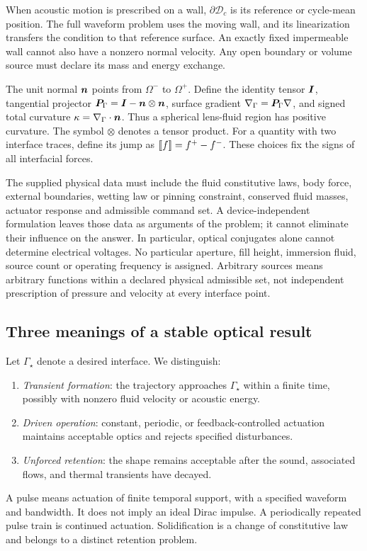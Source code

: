 When acoustic motion is prescribed on a wall, $\partial\mathcal D_c$ is its
reference or cycle-mean position. The full waveform problem uses the moving
wall, and its linearization transfers the condition to that reference surface.
An exactly fixed impermeable wall cannot also have a nonzero normal velocity.
Any open boundary or volume source must declare its mass and energy exchange.

The unit normal $\bm n$ points from $\Omega^-$ to $\Omega^+$. Define the identity
tensor $\bm I$, tangential projector $\bm P_\Gamma=\bm I-\bm n\otimes\bm n$, surface gradient
$\nabla_\Gamma=\bm P_\Gamma\nabla$, and signed total curvature
$\kappa=\nabla_\Gamma\cdot\bm n$. Thus a spherical lens-fluid region has positive
curvature. The symbol $\otimes$ denotes a tensor product. For a quantity with
two interface traces, define its jump as
$\left[\!\left[f\right]\!\right]=f^+-f^-$. These choices fix the signs of all interfacial forces.

The supplied physical data must include the fluid constitutive laws,
body force, external boundaries, wetting law or pinning
constraint, conserved fluid masses, actuator response and admissible command
set. A device-independent formulation leaves those data as arguments of the
problem; it cannot eliminate their influence on the answer. In particular,
optical conjugates alone cannot determine electrical voltages. No particular
aperture, fill height, immersion fluid, source count or operating frequency is
assigned. Arbitrary sources means arbitrary functions within a declared
physical admissible set, not independent prescription of pressure and velocity
at every interface point.

\subsection{Three meanings of a stable optical result}
Let $\Gamma_\star$ denote a desired interface. We distinguish:
\begin{enumerate}
\item \emph{Transient formation}: the trajectory approaches $\Gamma_\star$
within a finite time, possibly with nonzero fluid velocity or acoustic energy.
\item \emph{Driven operation}: constant, periodic, or feedback-controlled
actuation maintains acceptable optics and rejects specified disturbances.
\item \emph{Unforced retention}: the shape remains acceptable after the sound,
associated flows, and thermal transients have decayed.
\end{enumerate}
A pulse means actuation of finite temporal support, with a specified waveform
and bandwidth. It does not imply an ideal Dirac impulse. A periodically repeated
pulse train is continued actuation. Solidification is a change of constitutive
law and belongs to a distinct retention problem.

